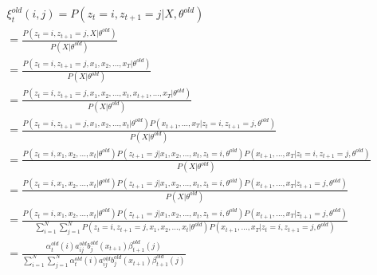 \documentclass[12pt,a4paper]{article}
\begin{document}
\begin{gather*}
    \xi_{t}^{old}(i,j) = P(z_t = i,z_{t+1} = j|X,\theta^{old})\\
    = \frac{P(z_t = i,z_{t+1} = j,X|\theta^{old})}{P(X|\theta^{old})}\\
    = \frac{P(z_t = i,z_{t+1} = j,x_1,x_2,...,x_T|\theta^{old})}{P(X|\theta^{old})}\\
    = \frac{P(z_t = i,z_{t+1} = j,x_1,x_2,...,x_t,x_{t+1},...,x_T|\theta^{old})}{P(X|\theta^{old})}\\
    = \frac{P(z_t = i,z_{t+1} = j,x_1,x_2,...,x_t|\theta^{old})P(x_{t+1},...,x_T|z_t = i,z_{t+1} = j,\theta^{old})}{P(X|\theta^{old})}\\
    = \frac{P(z_t = i,x_1,x_2,...,x_t|\theta^{old})P(z_{t+1} = j|x_1,x_2,...,x_t,z_t = i,\theta^{old})P(x_{t+1},...,x_T|z_t = i,z_{t+1} = j,\theta^{old})}{P(X|\theta^{old})}\\
    = \frac{P(z_t = i,x_1,x_2,...,x_t|\theta^{old})P(z_{t+1} = j|x_1,x_2,...,x_t,z_t = i,\theta^{old})P(x_{t+1},...,x_T|z_{t+1} = j,\theta^{old})}{P(X|\theta^{old})}\\
    = \frac{P(z_t = i,x_1,x_2,...,x_t|\theta^{old})P(z_{t+1} = j|x_1,x_2,...,x_t,z_t = i,\theta^{old})P(x_{t+1},...,x_T|z_{t+1} = j,\theta^{old})}{\sum
    _{i=1}^{N}\sum_{j=1}^{N}P(z_t = i,z_{t+1} = j,x_1,x_2,...,x_t|\theta^{old})P(x_{t+1},...,x_T|z_t = i,z_{t+1} = j,\theta^{old})}\\
    = \frac{\alpha_{t}^{old}(i)a_{ij}^{old}b_j^{old}(x_{t+1})\beta_{t+1}^{old}(j)}{\sum_{i=1}^{N}\sum_{j=1}^{N}\alpha_{t}^{old}(i)a_{ij}^{old}b_j^{old}(x_{t+1})\beta_{t+1}^{old}(j)}\\
\end{gather*}
\end{document}
